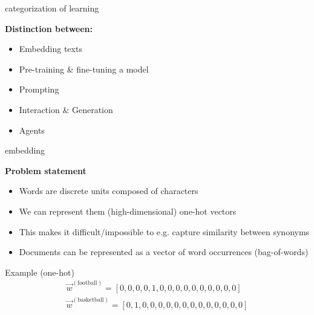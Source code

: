 \begin{vbframe}{categorization of learning}

\vfill

\textbf{Distinction between:}

	\begin{itemize}
		\item Embedding texts
		\item Pre-training \& fine-tuning a model
		\item Prompting
		\item Interaction \& Generation
		\item Agents
	\end{itemize}

\vfill

\end{vbframe}



\begin{vbframe}{embedding}

\vfill

\textbf{Problem statement}

\begin{itemize}
	\item Words are discrete units composed of characters
	\item We can represent them (high-dimensional) one-hot vectors
	\item This makes it difficult/impossible to e.g. capture similarity between synonyms
	\item Documents can be represented as a vector of word occurrences (bag-of-words)
\end{itemize}
	
\begin{exampleblock}{Example (one-hot)}
	\begin{align*}
			\vec w^{({\text{football}})} = [0,0,0,0,1,0,0,0,0,0,0,0,0,0,0]\\\vec w^{({\text{basketball}})} = [0,1,0,0,0,0,0,0,0,0,0,0,0,0,0]
	\end{align*}
\end{exampleblock}

\vfill

\end{vbframe}


